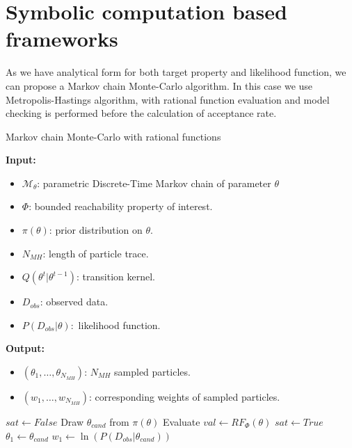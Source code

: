 \section{Symbolic computation based frameworks}
\newpage
As we have analytical form for both target property and likelihood function, we can propose a Markov
chain Monte-Carlo algorithm. In this case we use Metropolis-Hastings algorithm, with rational
function evaluation and model checking is performed before the calculation of acceptance rate.
\begin{algorithm}[H]
      \caption{Markov chain Monte-Carlo with rational functions}
      \label{rf-mcmc-alg}
      \hspace*{\algorithmicindent} \textbf{Input:}
      \begin{itemize}
            \item $\mathcal{M}_\theta$: parametric Discrete-Time Markov chain of parameter $\theta$
            \item $\Phi$: bounded reachability property of interest.
            \item $\pi(\theta)$: prior distribution on $\theta$.
            \item $N_{MH}$: length of particle trace.
            \item $Q(\theta^t|\theta^{t-1})$: transition kernel.
            \item $D_{obs}$: observed data.
            \item $P(D_{obs}|\theta):$ likelihood function.
      \end{itemize}
      \hspace*{\algorithmicindent} \textbf{Output:}
      \begin{itemize}
            \item $(\theta_1,\ldots,\theta_{N_{MH}})$: $N_{MH}$ sampled particles.
            \item $(w_1,\ldots,w_{N_{MH}})$: corresponding weights of sampled particles.
      \end{itemize}
      \begin{algorithmic}[1]
            \State $sat \leftarrow False$
            \State Draw $\theta_{cand}$ from $\pi(\theta)$
            \State Evaluate $val \leftarrow RF_{\Phi}(\theta)$
            \State $sat \leftarrow True$
            \EndIf
            \EndWhile
            \State $\theta_1 \leftarrow  \theta_{cand}$
            \State $w_1 \leftarrow  \ln(P(D_{obs}|\theta_{cand}))$
      \end{algorithmic}
\end{algorithm}

